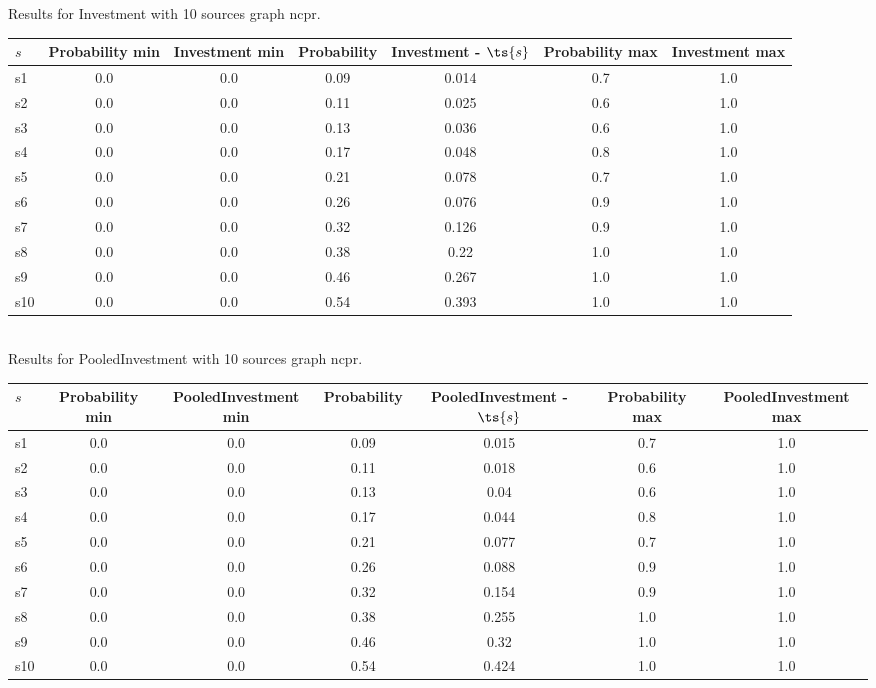 \documentclass{article}
\begin{document}
\noindent Results for Investment with 10 sources graph ncpr.

\noindent\begin{tabular}{|l|c|c|c|c|c|c|}
\hline
$s$& Probability min & Investment min & Probability & Investment - $\ts{s}$ & Probability max & Investment max\\
\hline
s1 &0.0 & 0.0 & 0.09 & 0.014 & 0.7 & 1.0\\
\hline
s2 &0.0 & 0.0 & 0.11 & 0.025 & 0.6 & 1.0\\
\hline
s3 &0.0 & 0.0 & 0.13 & 0.036 & 0.6 & 1.0\\
\hline
s4 &0.0 & 0.0 & 0.17 & 0.048 & 0.8 & 1.0\\
\hline
s5 &0.0 & 0.0 & 0.21 & 0.078 & 0.7 & 1.0\\
\hline
s6 &0.0 & 0.0 & 0.26 & 0.076 & 0.9 & 1.0\\
\hline
s7 &0.0 & 0.0 & 0.32 & 0.126 & 0.9 & 1.0\\
\hline
s8 &0.0 & 0.0 & 0.38 & 0.22 & 1.0 & 1.0\\
\hline
s9 &0.0 & 0.0 & 0.46 & 0.267 & 1.0 & 1.0\\
\hline
s10 &0.0 & 0.0 & 0.54 & 0.393 & 1.0 & 1.0\\
\hline
\end{tabular}\\

\noindent Results for PooledInvestment with 10 sources graph ncpr.

\noindent\begin{tabular}{|l|c|c|c|c|c|c|}
\hline
$s$& Probability min & PooledInvestment min & Probability & PooledInvestment - $\ts{s}$ & Probability max & PooledInvestment max\\
\hline
s1 &0.0 & 0.0 & 0.09 & 0.015 & 0.7 & 1.0\\
\hline
s2 &0.0 & 0.0 & 0.11 & 0.018 & 0.6 & 1.0\\
\hline
s3 &0.0 & 0.0 & 0.13 & 0.04 & 0.6 & 1.0\\
\hline
s4 &0.0 & 0.0 & 0.17 & 0.044 & 0.8 & 1.0\\
\hline
s5 &0.0 & 0.0 & 0.21 & 0.077 & 0.7 & 1.0\\
\hline
s6 &0.0 & 0.0 & 0.26 & 0.088 & 0.9 & 1.0\\
\hline
s7 &0.0 & 0.0 & 0.32 & 0.154 & 0.9 & 1.0\\
\hline
s8 &0.0 & 0.0 & 0.38 & 0.255 & 1.0 & 1.0\\
\hline
s9 &0.0 & 0.0 & 0.46 & 0.32 & 1.0 & 1.0\\
\hline
s10 &0.0 & 0.0 & 0.54 & 0.424 & 1.0 & 1.0\\
\hline
\end{tabular}\\
\end{document}
